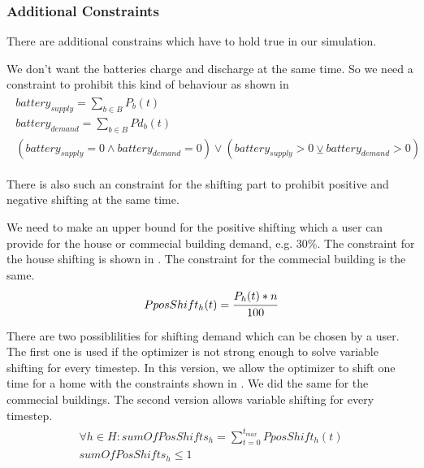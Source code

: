 \subsubsection{Additional Constraints}
There are additional constrains which have to hold true in our simulation.

We don't want the batteries charge and discharge at the same time.
So we need a constraint to prohibit this kind of behaviour as shown in 
\begin{align} \label{eq:batteryConstraint}
\begin{split}
battery_{supply} = \sum\limits_{b\in B} P_{b}(t)\\
battery_{demand} = \sum\limits_{b\in B} Pd_{b}(t)\\
(battery_{supply} = 0 \wedge battery_{demand} = 0 ) \vee (battery_{supply} > 0 \veebar battery_{demand} > 0)
\end{split}
\end{align}

There is also such an constraint for the shifting part to prohibit positive and negative shifting at the same time.

We need to make an upper bound for the positive shifting which a user can provide for the house or commecial building demand, e.g. 30\%.
The constraint for the house shifting is shown in .
The constraint for the commecial building is the same.
\begin{align} \label{eq:shiftingUpperBound}
\begin{split}
PposShift_h(t) = \cfrac{P_{h}(t) * n}{100}
\end{split}
\end{align}

There are two possiblilities for shifting demand which can be chosen by a user.
The first one is used if the optimizer is not strong enough to solve variable shifting for every timestep.
In this version, we allow the optimizer to shift one time for a home with the constraints shown in .
We did the same for the commecial buildings.
The second version allows variable shifting for every timestep.
\begin{align} \label{eq:numberOfShifts}
\begin{split}
\forall h \in H: sumOfPosShifts_{h} = \sum\limits_{t = 0}^{t_{max}} PposShift_h(t)\\
sumOfPosShifts_{h} \leq 1
\end{split}
\end{align}


